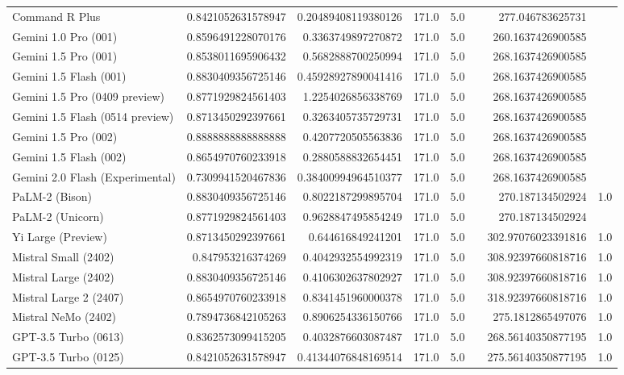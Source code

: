 \begin{table}[htp]
{\begin{tabular}{lrrrrrrr}
Command R Plus & 0.8421052631578947 & 0.20489408119380126 & 171.0 & 5.0 &  & 277.046783625731 &  \\
Gemini 1.0 Pro (001) & 0.8596491228070176 & 0.3363749897270872 & 171.0 & 5.0 &  & 260.1637426900585 &  \\
Gemini 1.5 Pro (001) & 0.8538011695906432 & 0.5682888700250994 & 171.0 & 5.0 &  & 268.1637426900585 &  \\
Gemini 1.5 Flash (001) & 0.8830409356725146 & 0.45928927890041416 & 171.0 & 5.0 &  & 268.1637426900585 &  \\
Gemini 1.5 Pro (0409 preview) & 0.8771929824561403 & 1.2254026856338769 & 171.0 & 5.0 &  & 268.1637426900585 &  \\
Gemini 1.5 Flash (0514 preview) & 0.8713450292397661 & 0.3263405735729731 & 171.0 & 5.0 &  & 268.1637426900585 &  \\
Gemini 1.5 Pro (002) & 0.8888888888888888 & 0.4207720505563836 & 171.0 & 5.0 &  & 268.1637426900585 &  \\
Gemini 1.5 Flash (002) & 0.8654970760233918 & 0.2880588832654451 & 171.0 & 5.0 &  & 268.1637426900585 &  \\
Gemini 2.0 Flash (Experimental) & 0.7309941520467836 & 0.38400994964510377 & 171.0 & 5.0 &  & 268.1637426900585 &  \\
PaLM-2 (Bison) & 0.8830409356725146 & 0.8022187299895704 & 171.0 & 5.0 &  & 270.187134502924 & 1.0 \\
PaLM-2 (Unicorn) & 0.8771929824561403 & 0.9628847495854249 & 171.0 & 5.0 &  & 270.187134502924 &  \\
Yi Large (Preview) & 0.8713450292397661 & 0.644616849241201 & 171.0 & 5.0 &  & 302.97076023391816 & 1.0 \\
Mistral Small (2402) & 0.847953216374269 & 0.4042932554992319 & 171.0 & 5.0 &  & 308.92397660818716 & 1.0 \\
Mistral Large (2402) & 0.8830409356725146 & 0.4106302637802927 & 171.0 & 5.0 &  & 308.92397660818716 & 1.0 \\
Mistral Large 2 (2407) & 0.8654970760233918 & 0.8341451960000378 & 171.0 & 5.0 &  & 318.92397660818716 & 1.0 \\
Mistral NeMo (2402) & 0.7894736842105263 & 0.8906254336150766 & 171.0 & 5.0 &  & 275.1812865497076 & 1.0 \\
GPT-3.5 Turbo (0613) & 0.8362573099415205 & 0.4032876603087487 & 171.0 & 5.0 &  & 268.56140350877195 & 1.0 \\
GPT-3.5 Turbo (0125) & 0.8421052631578947 & 0.41344076848169514 & 171.0 & 5.0 &  & 275.56140350877195 & 1.0 \\

\end{tabular}}
\end{table}
